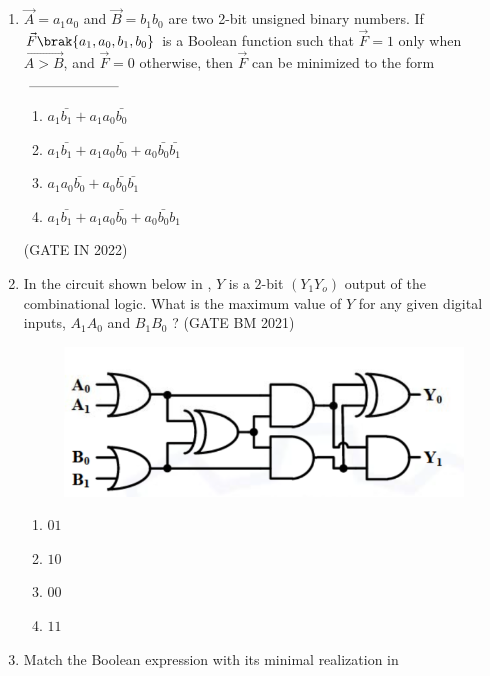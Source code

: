 \begin{enumerate}[label=\arabic*.,ref=\theenumi]
\item $\vec{A}=a_1a_0$ and $\vec{B}=b_1b_0$ are two 2-bit unsigned binary numbers. If $\vec{F}\brak{a_1,a_0,b_1,b_0}$ is a Boolean function such that $\vec{F} = 1$ only when $\vec{A > B}$, and $\vec{F} = 0$ otherwise, then $\vec{F}$ can be minimized to the form $\rule{2.5cm}{0.10mm}$
\begin{enumerate}
\item $a_1\bar{b_1}+a_1a_0\bar{b_0}$
\item $a_1\bar{b_1}+a_1a_0\bar{b_0}+a_0\bar{b_0}\bar{b_1}$
\item $a_1a_0\bar{b_0}+a_0\bar{b_0}\bar{b_1}$
\item $a_1\bar{b_1}+a_1a_0\bar{b_0}+a_0\bar{b_0}b_1$
\end{enumerate}
\hfill(GATE IN 2022)
%
\item In the circuit shown below in 
,
 $Y$ is a $2$-bit $(Y_1Y_o)$ output of the combinational logic. What is the 
maximum value of $Y$ for any given digital inputs, $A_1A_0$ and $B_1B_0$ ?
\hfill(GATE BM 2021)
\begin{figure}[H]
\centering
\includegraphics[width=0.5\columnwidth]{ide/kmap/figs/Fig-1.png}
\caption{}
\label{fig:fig-1.png}
\end{figure}
\begin{enumerate}[label=(\Alph*)]
\item $01$
\item $10$
\item $00$
\item $11$
\end{enumerate}
\item Match the Boolean expression with its minimal realization
	in 
	\begin{table}[H]
		\centering
\end{table}
\end{enumerate}
